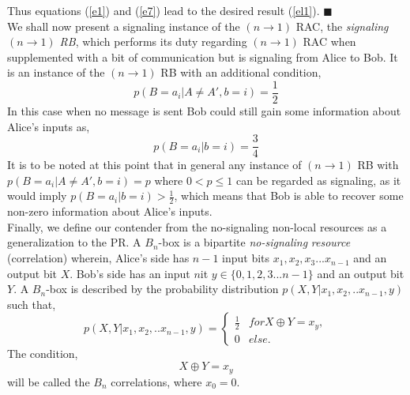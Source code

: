 \documentclass[%
 reprint,
 amsmath,amssymb,
 aps,
]{revtex4-1}
\begin{document}
Thus equations (\ref{e1}) and (\ref{e7}) lead to the desired result  (\ref{el1}). $\blacksquare$ \\
We shall now present a signaling instance of the $(n\rightarrow1)$ RAC, the \textit{signaling $(n\rightarrow1)$ RB}, which performs its duty regarding $(n\rightarrow 1)$ RAC when supplemented with a bit of communication but is signaling from Alice to Bob. It is an instance of the $(n\rightarrow1)$ RB with an additional condition,
\begin{equation}\label{sigme}
p(B=a_i|A\neq A',b=i)=\frac{1}{2}
\end{equation}
In this case when no message is sent Bob could still gain some information about Alice's inputs as,
\begin{equation}
p(B=a_i|b=i)=\frac{3}{4}
\end{equation}
It is to be noted at this point that in general any instance of $(n\rightarrow1)$ RB with $p(B=a_i|A\neq A',b=i)=p$ where $0<p\leq 1$ can be regarded as signaling, as it would imply  $p(B=a_i|b=i)> \frac{1}{2}$, which means that Bob is able to recover some non-zero information about Alice's inputs.  \\
Finally, we define our contender from the no-signaling non-local resources as a generalization to the PR. A  $B_n$-box is a bipartite \textit{no-signaling} \textit{resource} (correlation) wherein, Alice's side has $n-1$ input bits $x_{1},x_{2},x_{3}...x_{n-1}$ and an output bit $X$. Bob's side has an input $n$it $y\in\{0,1,2,3...n-1\}$ and an output bit $Y$. A $B_n$-box is described by the probability distribution $p(X,Y|x_1,x_2,..x_{n-1},y)$ such that,
\begin{equation}
p(X,Y|x_1,x_2,..x_{n-1},y)=
\begin{cases}
\frac{1}{2} & for X\oplus Y=x_y,\\
0 & else.
\end{cases}
\end{equation}
The condition,
\begin{equation} \label{Bncorr}
X\oplus Y=x_y
\end{equation}
will be called the $B_n$ correlations, where $x_0=0$. 
\end{document}
